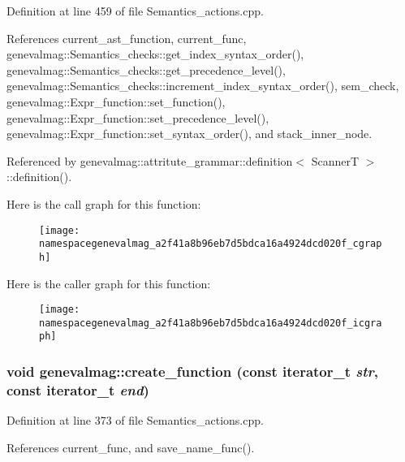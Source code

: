 Definition at line 459 of file Semantics\_\-actions.cpp.



References current\_\-ast\_\-function, current\_\-func, genevalmag::Semantics\_\-checks::get\_\-index\_\-syntax\_\-order(), genevalmag::Semantics\_\-checks::get\_\-precedence\_\-level(), genevalmag::Semantics\_\-checks::increment\_\-index\_\-syntax\_\-order(), sem\_\-check, genevalmag::Expr\_\-function::set\_\-function(), genevalmag::Expr\_\-function::set\_\-precedence\_\-level(), genevalmag::Expr\_\-function::set\_\-syntax\_\-order(), and stack\_\-inner\_\-node.



Referenced by genevalmag::attritute\_\-grammar::definition$<$ ScannerT $>$::definition().



Here is the call graph for this function:\nopagebreak
\begin{figure}[H]
\begin{center}
\leavevmode
\texttt{[image: namespacegenevalmag\_a2f41a8b96eb7d5bdca16a4924dcd020f\_cgraph]}
\end{center}
\end{figure}




Here is the caller graph for this function:\nopagebreak
\begin{figure}[H]
\begin{center}
\leavevmode
\texttt{[image: namespacegenevalmag\_a2f41a8b96eb7d5bdca16a4924dcd020f\_icgraph]}
\end{center}
\end{figure}


\hypertarget{namespacegenevalmag_a166358b221cbf34ec512b137326d6c44}{
\subsubsection[{create\_\-function}]{\setlength{\rightskip}{0pt plus 5cm}void genevalmag::create\_\-function (const iterator\_\-t {\em str}, \/  const iterator\_\-t {\em end})}}
\label{namespacegenevalmag_a166358b221cbf34ec512b137326d6c44}


Definition at line 373 of file Semantics\_\-actions.cpp.



References current\_\-func, and save\_\-name\_\-func().



